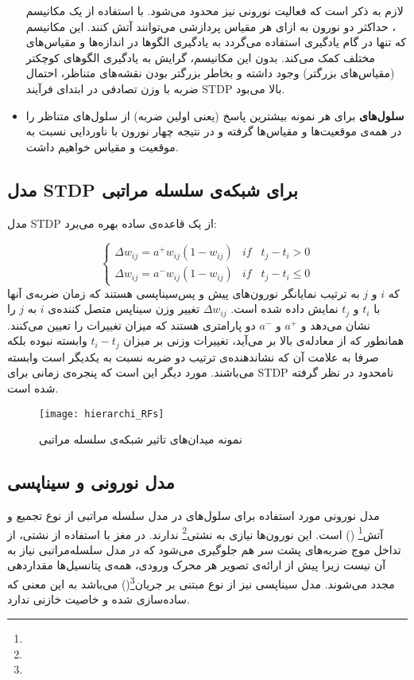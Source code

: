 \begin{itemize}
لازم به ذکر است که فعالیت نورونی نیز محدود می‌شود. با استفاده از یک مکانیسم ، حداکثر دو نورون به ازای هر مقیاس پردازشی می‌توانند آتش کنند. این مکانیسم که تنها در گام یادگیری استفاده می‌گردد به یادگیری الگوها در اندازه‌ها و مقیاس‌های مختلف کمک می‌کند. بدون این مکانیسم، گرایش به یادگیری الگو‌های کوچکتر (مقیاس‌های بزرگتر) وجود داشته و بخاطر بزرگتر بودن نقشه‌های متناظر، احتمال ضربه با وزن تصادفی در ابتدا‌ی فرآیند STDP بالا می‌بود. 

\item
\textbf{سلول‌های } برای هر نمونه بیشترین پاسخ (یعنی اولین ضربه) از سلول‌های  متناظر را در همه‌ی موقعیت‌ها و مقیاس‌ها گرفته و در نتیجه چهار نورون با ناوردایی نسبت به موقعیت و مقیاس خواهیم داشت.
\end{itemize}
\subsection{مدل STDP برای شبکه‌ی سلسله مراتبی}

مدل STDP از یک قاعده‌ی ساده بهره می‌برد:

\begin{equation} 
\left\{\begin{matrix}
\Delta w_{ij} = a^+w_{ij}(1-w_{ij}) & if \; \; \; t_j-t_i > 0 \\ 
\Delta w_{ij} = a^-w_{ij}(1-w_{ij}) & if \; \; \; t_j-t_i \leq  0
\end{matrix}\right.
\end{equation} 
که $i$ و $j$ به ترتیب  نمایانگر نورون‌های پیش و پس‌سیناپسی هستند که زمان ضربه‌ی آنها با  $t_i$ و $t_j$ نمایش داده شده است. $\Delta w_{ij}$ تغییر وزن سیناپس متصل کننده‌ی $i$ به $j$ را نشان می‌دهد و $a^+$ و $a^-$ دو پارامتری هستند که میزان تغییرات را تعیین می‌کنند. همانطور که از معادله‌ی بالا بر می‌آید، تغییرات وزنی بر میزان $t_i-t_j$ وابسته نبوده بلکه صرفا به علامت آن که نشاندهنده‌ی ترتیب دو ضربه نسبت به یکدیگر است وابسته می‌باشند. مورد دیگر این است که پنجره‌ی زمانی برای STDP نامحدود در نظر گرفته شده است. 

\begin{figure}
\centering
{\footnotesize
\texttt{[image: hierarchi\_RFs]}
\caption{نمونه میدان‌های تاثیر شبکه‌ی سلسله مراتبی}
\label{fig:hierarchi_RFs}
}
\end{figure}

\subsection{مدل نورونی و سیناپسی}
مدل نورونی مورد استفاده برای سلول‌های  در مدل سلسله مراتبی از نوع تجمیع و آتش\footnote{} () است. این نورون‌ها نیازی به نشتی\footnote{} ندارند. در مغز با استفاده از نشتی، از تداخل موج ضربه‌های پشت سر هم جلوگیری می‌شود که در مدل سلسله‌مراتبی نیاز به آن نیست زیرا پیش از ارائه‌ی تصویر هر محرک ورودی، همه‌ی پتانسیل‌ها مقداردهی مجدد می‌شوند. مدل سیناپسی نیز از نوع مبتنی بر جریان\footnote{}() می‌باشد به این معنی که ساده‌سازی شده و خاصیت خازنی ندارد.

